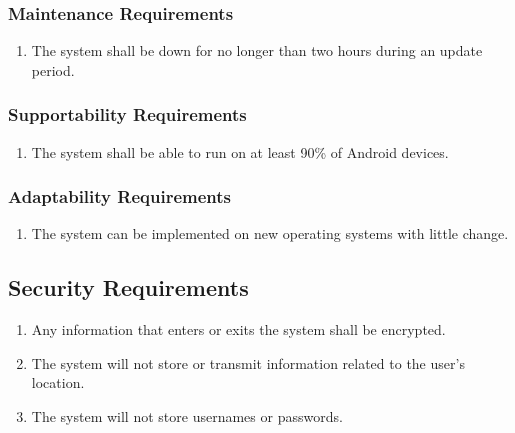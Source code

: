 \documentclass[titlepage]{article}
\newcounter{req}
\begin{document}
		\subsubsection{Maintenance Requirements}
		\label{ssub:maintenance_requirements}
		\begin{enumerate}[{MS}1. ]
		\setcounter{enumi}{\value{req}}
			\item 
			The system shall be down for no longer than two hours during an update period.
		\setcounter{req}{\theenumi}
		\end{enumerate}
		
		\subsubsection{Supportability Requirements}
		\label{ssub:supportability_requirements}
		\begin{enumerate}[{MS}1. ]
		\setcounter{enumi}{\value{req}}
			\item 
			The system shall be able to run on at least 90\% of Android devices.
		\setcounter{req}{\theenumi}
		\end{enumerate}
		
		\subsubsection{Adaptability Requirements}
		\label{ssub:adaptability_requirements}
		\begin{enumerate}[{MS}1. ]
		\setcounter{enumi}{\value{req}}
			\item
			The system can be implemented on new operating systems with little change.
		\setcounter{req}{\theenumi}
		\end{enumerate}
		
		
		\subsection{Security Requirements}
		\setcounter{req}{0}
		\label{sub:security_requirements}
		\begin{enumerate}[{SR}1. ]
		\setcounter{enumi}{\value{req}}
			\item
			Any information that enters or exits the system shall be encrypted.
			\item
			The system will not store or transmit information related to the user's location.
			\item
			The system will not store usernames or passwords.
		\setcounter{req}{\theenumi}
		\end{enumerate}
		
\end{document}
